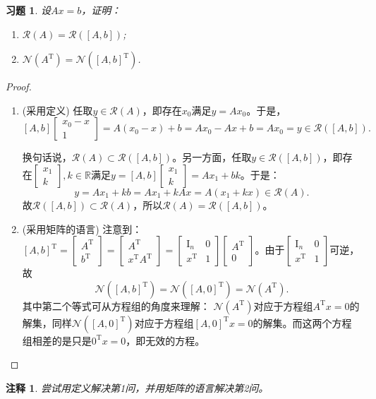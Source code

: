 \documentclass[UTF8]{ctexart}
\newtheorem{ex}[thm]{习题}
\newtheorem{rmk}[thm]{注释}
\begin{document}
\begin{ex}
设$Ax = b$，证明：
\begin{enumerate}
\item
$\mathcal{R}(A) = \mathcal{R}([A, b])$;
\item
$\mathcal{N}(A^\mathrm{T}) = \mathcal{N}([A, b]^{\mathrm{T}})$.
\end{enumerate}
\end{ex}

\begin{proof}
\begin{enumerate}
\item{(采用定义)}
任取$y \in \mathcal{R}(A)$，即存在$x_0$满足$y = Ax_0$。于是，
\[
[A, b] \begin{bmatrix}
x_0 - x \\
1
\end{bmatrix} = A(x_0 - x) + b = Ax_0 - Ax + b = Ax_0 = y \in \mathcal{R}([A, b]).
\]

换句话说，$\mathcal{R}(A) \subset \mathcal{R}([A, b])$。另一方面，任取$ y \in \mathcal{R}([A, b])$，即存在$\begin{bmatrix}
x_1\\
k
\end{bmatrix}, k\in \mathbb{R}$满足$y = [A, b]\begin{bmatrix}
x_1\\
k
\end{bmatrix} = Ax_1 + bk$。于是：
\[
y = Ax_1 + kb = Ax_1 + kAx = A(x_1+kx) \in \mathcal{R}(A).
\]
故$\mathcal{R}([A, b]) \subset \mathcal{R}(A)$，所以$\mathcal{R}(A) = \mathcal{R}([A, b])$。
\item{(采用矩阵的语言)}
注意到：$[A, b]^{\mathrm{T}} = \begin{bmatrix}
A^{\mathrm{T}} \\
b^{\mathrm{T}}
\end{bmatrix} = \begin{bmatrix}
A^{\mathrm{T}} \\
x^{\mathrm{T}}A^{\mathrm{T}}
\end{bmatrix}= \begin{bmatrix}
\mathrm{I}_n  & 0\\
x^{\mathrm{T}} & 1
\end{bmatrix}\begin{bmatrix}
A^{\mathrm{T}} \\
0
\end{bmatrix}$。由于$\begin{bmatrix}
\mathrm{I}_n  & 0\\
x^{\mathrm{T}} & 1
\end{bmatrix}$可逆，故
\[
\mathcal{N}([A, b]^{\mathrm{T}}) = \mathcal{N}([A, 0]^{\mathrm{T}}) = \mathcal{N}(A^\mathrm{T}).
\] 
其中第二个等式可从方程组的角度来理解：
$\mathcal{N}(A^\mathrm{T})$对应于方程组$A^\mathrm{T}x = 0$的解集，同样$\mathcal{N}([A, 0]^{\mathrm{T}})$对应于方程组$[A, 0]^{\mathrm{T}}x = 0$的解集。而这两个方程组相差的是只是$0^{\mathrm{T}}x = 0$，即无效的方程。
\end{enumerate}
\end{proof}
\begin{rmk}
尝试用定义解决第1问，并用矩阵的语言解决第2问。
\end{rmk}
\end{document}
